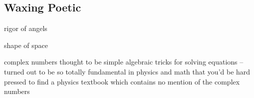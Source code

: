 %
%
%
%


%
%
%
%
%
%


%
%
%
%
%


\subsection*{Waxing Poetic}

rigor of angels

shape of space

complex numbers thought to be simple algebraic tricks for solving equations -- turned out to be so totally fundamental in physics and math that you'd be hard pressed to find a physics textbook which contains no mention of the complex numbers
